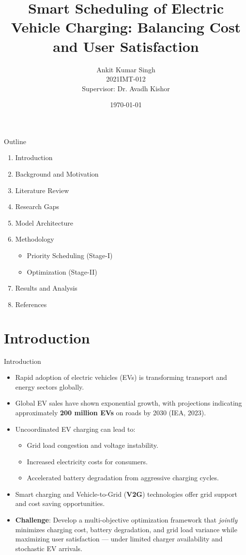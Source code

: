 \documentclass{beamer}
\title{Smart Scheduling of Electric Vehicle Charging: Balancing Cost and User Satisfaction}
\author{Ankit Kumar Singh \\ 2021IMT-012 \\ Supervisor: Dr. Avadh Kishor}
\institute{ABV–IIITM Gwalior}
\date{\today}
\begin{document}
\begin{frame}
  \titlepage
\end{frame}

\begin{frame}{Outline}
  \begin{enumerate}
    \item Introduction
    \item Background and Motivation
    \item Literature Review
    \item Research Gaps
    \item Model Architecture
    \item Methodology
    \begin{itemize}
        \item Priority Scheduling (Stage-I)
        \item Optimization (Stage-II)
    \end{itemize}
    \item Results and Analysis
    \item References
  \end{enumerate}
\end{frame}

\section{Introduction}
\begin{frame}{Introduction}
  \begin{itemize}
    \item Rapid adoption of electric vehicles (EVs) is transforming transport and energy sectors globally.
    \item Global EV sales have shown exponential growth, with projections indicating approximately \textbf{200 million EVs} on roads by 2030 (IEA, 2023).
    \item Uncoordinated EV charging can lead to:
    \begin{itemize}
        \item Grid load congestion and voltage instability.
        \item Increased electricity costs for consumers.
        \item Accelerated battery degradation from aggressive charging cycles.
    \end{itemize}
    \item Smart charging and Vehicle-to-Grid (\textbf{V2G}) technologies offer grid support and cost saving opportunities.
    \item \textbf{Challenge}: Develop a multi-objective optimization framework that \textit{jointly} minimizes charging cost, battery degradation, and grid load variance while maximizing user satisfaction --- under limited charger availability and stochastic EV arrivals.
  \end{itemize}
\end{frame}
\end{document}
